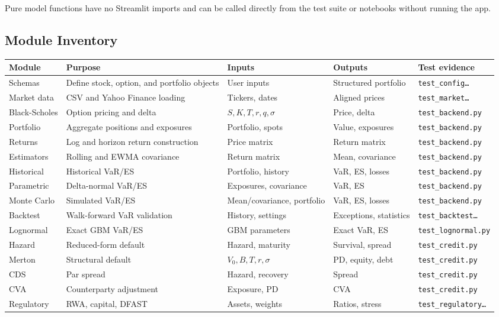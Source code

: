 \documentclass[11pt]{article}
\newcommand{\code}[1]{\texttt{#1}}
\begin{document}
Pure model functions have no Streamlit imports and can be called directly
from the test suite or notebooks without running the app.

\subsection{Module Inventory}

\begin{center}
\footnotesize
\begin{tabular}{L{2.2cm}L{3.8cm}L{2.4cm}L{2.2cm}L{2.7cm}}
\toprule
\textbf{Module} & \textbf{Purpose} & \textbf{Inputs} & \textbf{Outputs} & \textbf{Test evidence} \\
\midrule
Schemas & Define stock, option, and portfolio objects & User inputs & Structured portfolio & \code{test\_config\ldots} \\
Market data & CSV and Yahoo Finance loading & Tickers, dates & Aligned prices & \code{test\_market\ldots} \\
Black-Scholes & Option pricing and delta & $S,K,T,r,q,\sigma$ & Price, delta & \code{test\_backend.py} \\
Portfolio & Aggregate positions and exposures & Portfolio, spots & Value, exposures & \code{test\_backend.py} \\
Returns & Log and horizon return construction & Price matrix & Return matrix & \code{test\_backend.py} \\
Estimators & Rolling and EWMA covariance & Return matrix & Mean, covariance & \code{test\_backend.py} \\
Historical & Historical VaR/ES & Portfolio, history & VaR, ES, losses & \code{test\_backend.py} \\
Parametric & Delta-normal VaR/ES & Exposures, covariance & VaR, ES & \code{test\_backend.py} \\
Monte Carlo & Simulated VaR/ES & Mean/covariance, portfolio & VaR, ES, losses & \code{test\_backend.py} \\
Backtest & Walk-forward VaR validation & History, settings & Exceptions, statistics & \code{test\_backtest\ldots} \\
Lognormal & Exact GBM VaR/ES & GBM parameters & Exact VaR, ES & \code{test\_lognormal.py} \\
Hazard & Reduced-form default & Hazard, maturity & Survival, spread & \code{test\_credit.py} \\
Merton & Structural default & $V_0,B,T,r,\sigma$ & PD, equity, debt & \code{test\_credit.py} \\
CDS & Par spread & Hazard, recovery & Spread & \code{test\_credit.py} \\
CVA & Counterparty adjustment & Exposure, PD & CVA & \code{test\_credit.py} \\
Regulatory & RWA, capital, DFAST & Assets, weights & Ratios, stress & \code{test\_regulatory\ldots} \\
\bottomrule
\end{tabular}
\end{center}
\end{document}

